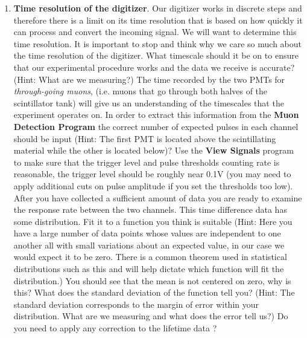 \documentclass{../lab}
\begin{document}
\begin{enumerate}
    \item \textbf{Time resolution of the digitizer}. Our digitizer works in discrete steps and therefore there is a limit on its time resolution that is based on how quickly it can process and convert the incoming signal. We will want to determine this time resolution. It is important to stop and think why we care so much about the time resolution of the digitizer. What timescale should it be on to ensure that our experimental procedure works and the data we receive is accurate? (Hint: What are we measuring?) The time recorded by the two PMTs for \emph{through-going muons}, (i.e. muons that go through both halves of the scintillator tank) will give us an understanding of the timescales that the experiment operates on. In order to extract this information from the \textbf{Muon Detection Program} the correct number of expected pulses in each channel should be input (Hint: The first PMT is located above the scintillating material while the other is located below)? Use the \textbf{View Signals} program to make sure that the trigger level and pulse thresholds counting rate is reasonable, the trigger level should be roughly near 0.1V (you may need to apply additional cuts on pulse amplitude if you set the thresholds too low). After you have collected a sufficient amount of data you are ready to examine the response rate between the two channels. This time difference data has some distribution. Fit it to a function you think is suitable (Hint: Here you have a large number of data points whose values are independent to one another all with small variations about an expected value, in our case we would expect it to be zero. There is a common theorem used in statistical distributions such as this and will help dictate which function will fit the distribution.) You should see that the mean is not centered on zero, why is this? What does the standard deviation of the function tell you? (Hint: The standard deviation corresponds to the margin of error within your distribution. What are we measuring and what does the error tell us?) Do you need to apply any correction to the lifetime data ?
    
    
    


\end{enumerate}
\end{document}
